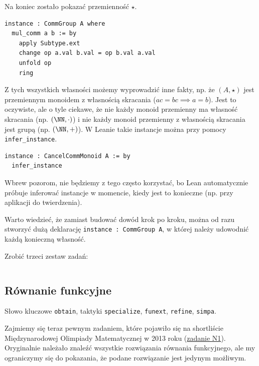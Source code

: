 \documentclass[polish,pretty,bibliography=totocnumbered]{angav}
\newcommand{\Lean}[1]{\texttt{#1}}
\begin{document}
Na koniec zostało pokazać przemienność $\star$.
\begin{verbatim}
instance : CommGroup A where
  mul_comm a b := by
    apply Subtype.ext
    change op a.val b.val = op b.val a.val
    unfold op
    ring
\end{verbatim}

Z tych wszystkich własności możemy wyprowadzić inne fakty, np. że $(A, \star)$ jest przemiennym monoidem z własnością skracania ($ac = bc \implies a = b$). Jest to oczywiste, ale o tyle ciekawe, że nie każdy monoid przemienny ma własność skracania (np. $(\NN, \cdot)$) i nie każdy monoid przemienny z własnością skracania jest grupą (np. $(\NN, +)$). W Leanie takie instancje można  przy pomocy \Lean{infer_instance}.
\begin{verbatim}
instance : CancelCommMonoid A := by
  infer_instance
\end{verbatim}
Wbrew pozorom, nie będziemy z tego często korzystać, bo Lean automatycznie próbuje inferować instancje w momencie, kiedy jest to konieczne (np. przy aplikacji do twierdzenia).

Warto wiedzieć, że zamiast budować dowód krok po kroku, można od razu stworzyć dużą deklarację \Lean{instance : CommGroup A}, w której należy udowodnić każdą konieczną własność.

\begin{problem}
    Zrobić trzeci zestaw zadań:
    \inputminted{lean4}{problemsets/problemset03.lean}
\end{problem}

\subsection{Równanie funkcyjne}

\begin{lesson-goals}
    Słowo kluczowe \Lean{obtain}, taktyki \Lean{specialize}, \Lean{funext}, \Lean{refine}, \Lean{simpa}.
\end{lesson-goals}

Zajmiemy się teraz pewnym zadaniem, które pojawiło się na shortliście Międzynarodowej Olimpiady Matematycznej w 2013 roku (\href{https://www.imo-official.org/problems/IMO2013SL.pdf#page=7}{zadanie N1}). Oryginalnie należało znaleźć wszystkie rozwiązania równania funkcyjnego, ale my ograniczymy się do pokazania, że podane rozwiązanie jest jedynym możliwym.
\end{document}
